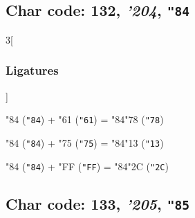 \documentclass{article}
\newlength{\maxcharwidth}
\begin{document}
\subsection{Char code: 132, {\it'204}, {\tt"84}}
\label{char_132}


\begin{multicols}{3}[\subsubsection{Ligatures}]

{\testfont\char"84\noboundary} ({\tt"84}) + {\testfont\char"61\noboundary} ({\tt"61}) = {\testfont\char"84\noboundary}{\testfont\char"78\noboundary} ({\tt"78}) 

{\testfont\char"84\noboundary} ({\tt"84}) + {\testfont\char"75\noboundary} ({\tt"75}) = {\testfont\char"84\noboundary}{\testfont\char"13\noboundary} ({\tt"13}) 

{\testfont\char"84\noboundary} ({\tt"84}) + {\testfont\char"FF\noboundary} ({\tt"FF}) = {\testfont\char"84\noboundary}{\testfont\char"2C\noboundary} ({\tt"2C}) 

\end{multicols}

\subsection{Char code: 133, {\it'205}, {\tt"85}}
\label{char_133}

\end{document}
